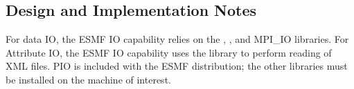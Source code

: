 
\subsection{Design and Implementation Notes}

For data IO, the ESMF IO capability relies on the 
, 
, 
and MPI\_IO libraries.  For Attribute IO, the ESMF IO capability uses the 
 library to 
perform reading of XML files.  PIO is included with the ESMF distribution; 
the other libraries must be installed on the machine of interest.

